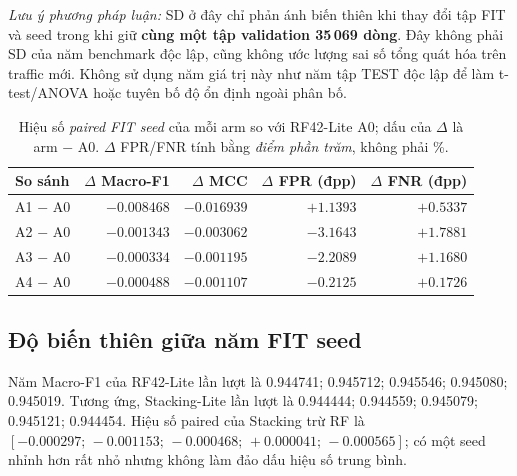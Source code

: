 \begin{table}[htbp]
\begin{minipage}{\linewidth}
\footnotesize\emph{Lưu ý phương pháp luận:} SD ở đây chỉ phản ánh biến thiên khi thay đổi tập FIT và seed trong khi giữ \textbf{cùng một tập validation 35\,069 dòng}. Đây không phải SD của năm benchmark độc lập, cũng không ước lượng sai số tổng quát hóa trên traffic mới. Không sử dụng năm giá trị này như năm tập TEST độc lập để làm t-test/ANOVA hoặc tuyên bố độ ổn định ngoài phân bố.
\end{minipage}
\end{table}

\begin{table}[htbp]\centering
\small
\renewcommand{\arraystretch}{1.24}
\setlength{\tabcolsep}{3pt}
\caption{Hiệu số \emph{paired FIT seed} của mỗi arm so với RF42-Lite A0; dấu của $\Delta$ là arm $-$ A0. $\Delta$ FPR/FNR tính bằng \emph{điểm phần trăm}, không phải \%.}
\label{tab:p21-paired-deltas}
\begin{tabular}{lrrrr}
\toprule
So sánh & $\Delta$ Macro-F1 & $\Delta$ MCC & $\Delta$ FPR (đpp) & $\Delta$ FNR (đpp)\\\midrule
A1 $-$ A0 & $-0.008468$ & $-0.016939$ & $+1.1393$ & $+0.5337$\\
A2 $-$ A0 & $-0.001343$ & $-0.003062$ & $-3.1643$ & $+1.7881$\\
A3 $-$ A0 & $-0.000334$ & $-0.001195$ & $-2.2089$ & $+1.1680$\\
A4 $-$ A0 & $-0.000488$ & $-0.001107$ & $-0.2125$ & $+0.1726$\\\bottomrule
\end{tabular}
\end{table}

\subsection{Độ biến thiên giữa năm FIT seed}
Năm Macro-F1 của RF42-Lite lần lượt là 0.944741; 0.945712; 0.945546; 0.945080; 0.945019. Tương ứng, Stacking-Lite lần lượt là 0.944444; 0.944559; 0.945079; 0.945121; 0.944454. Hiệu số paired của Stacking trừ RF là $[-0.000297;\,-0.001153;\,-0.000468;\,+0.000041;\,-0.000565]$; có một seed nhỉnh hơn rất nhỏ nhưng không làm đảo dấu hiệu số trung bình.

